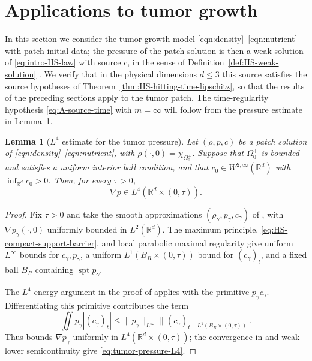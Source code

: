 \documentclass[11pt]{amsart}
\numberwithin{equation}{section}
\numberwithin{figure}{section}
\theoremstyle{plain}
\newtheorem{lem}[thm]{Lemma}
\theoremstyle{definition}
\theoremstyle{remark}
\theoremstyle{plain}
\newcommand{\supp}{\operatorname{spt}}
\def\R{\mathbb{R}}
\begin{document}
\section{Applications to tumor growth}\label{sec:tumor-applications}


In this section we consider the tumor growth model
\eqref{eqn:density}--\eqref{eqn:nutrient} with patch initial data; the pressure of the patch
solution is then a weak solution of \eqref{eq:intro-HS-law} with source $c$, in the sense of
Definition~\ref{def:HS-weak-solution} \cite{JKT21}. We verify that in the physical
dimensions $d\leq3$ this source
satisfies the source hypotheses of Theorem~\ref{thm:HS-hitting-time-lipschitz}, so that the
results of the preceding sections apply to the tumor patch. The time-regularity hypothesis
\eqref{eq:A-source-time} with $m=\infty$ will follow from the pressure estimate
in Lemma~\ref{lem:tumor-pressure-L4}.

\begin{lem}[$L^4$ estimate for the tumor pressure]
\label{lem:tumor-pressure-L4}
Let $(\rho,p,c)$ be a patch solution of
\eqref{eqn:density}--\eqref{eqn:nutrient}, with
$\rho(\cdot,0)=\chi_{\Omega_0^{+}}$.  Suppose that $\Omega_0^{+}$ is bounded
and satisfies a uniform interior ball condition, and that
$c_0\in W^{2,\infty}(\R^d)$ with $\inf_{\R^d}c_0>0$.  Then, for every
$\tau>0$,
\begin{equation}\label{eq:tumor-pressure-L4}
    \nabla p\in L^4(\R^d\times(0,\tau)).
\end{equation}
\end{lem}

\begin{proof}
Fix $\tau>0$ and take the smooth approximations
$(\rho_\gamma,p_\gamma,c_\gamma)$ of \cite[Prop.~3.1]{CJK25}, with
$\nabla p_\gamma(\cdot,0)$ uniformly bounded in $L^2(\R^d)$. The maximum principle,
\eqref{eq:HS-compact-support-barrier}, and local parabolic maximal regularity give
uniform $L^\infty$ bounds for $c_\gamma,p_\gamma$, a uniform
$L^1(B_R\times(0,\tau))$ bound for $(c_\gamma)_t$, and a fixed ball $B_R$
containing $\supp p_\gamma$.

The $L^4$ energy argument in the proof of
\cite[Thm.~3.2]{DavidPerthame} applies with the primitive
$p_\gamma c_\gamma$.  Differentiating this primitive contributes the term
\[
 \iint p_\gamma |(c_\gamma)_t|
 \leq \|p_\gamma\|_{L^\infty}
       \|(c_\gamma)_t\|_{L^1(B_R\times(0,\tau))}.
\]
Thus \cite[proof of Thm.~3.2]{DavidPerthame} bounds
$\nabla p_\gamma$ uniformly in $L^4(\R^d\times(0,\tau))$; the convergence in
\cite[Prop.~3.1]{CJK25} and weak lower semicontinuity give
\eqref{eq:tumor-pressure-L4}.
\end{proof}
\end{document}
